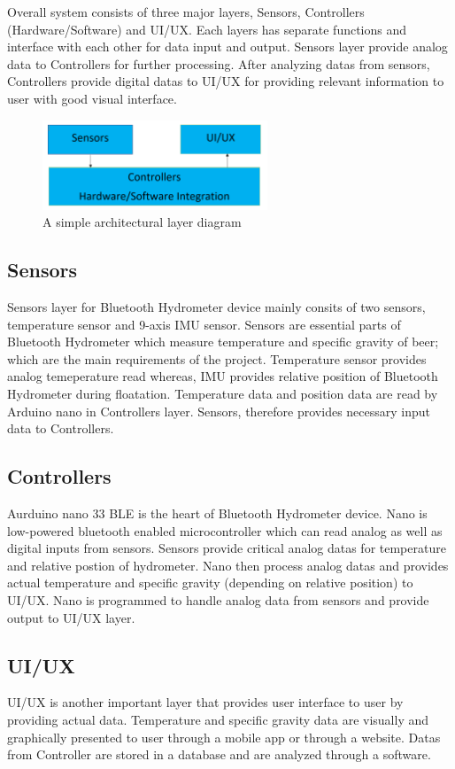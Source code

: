 Overall system consists of three major layers, Sensors, Controllers (Hardware/Software) and UI/UX. Each layers has separate functions and interface with each other for data input and output. Sensors layer provide analog data to Controllers for further processing. After analyzing datas from sensors, Controllers provide digital datas to UI/UX for providing relevant information to user with good visual interface.

\begin{figure}[h!]
	\centering
 	\includegraphics[width=0.60\textwidth]{images/bluetooth_hydrometer_layers}
 \caption{A simple architectural layer diagram}
\end{figure}

\subsection{Sensors}
Sensors layer for Bluetooth Hydrometer device mainly consits of two sensors, temperature sensor and 9-axis IMU sensor.  Sensors are essential parts of Bluetooth Hydrometer which measure temperature and specific gravity of beer; which are the main requirements of the project.  Temperature sensor provides analog temeperature read whereas, IMU provides relative position of Bluetooth Hydrometer during floatation. Temperature data and position data are read by Arduino nano in Controllers layer. Sensors, therefore provides necessary input data to Controllers.

\subsection{Controllers}
Aurduino nano 33 BLE is the heart of Bluetooth Hydrometer device. Nano is low-powered bluetooth enabled microcontroller which can read analog as well as digital inputs from sensors.  Sensors provide critical analog datas for temperature and relative postion of hydrometer.  Nano then process analog datas and provides actual temperature and specific gravity (depending on relative position) to UI/UX. 
Nano is programmed to handle analog data from sensors and provide output to UI/UX layer.


\subsection{UI/UX}
UI/UX is another important layer that provides user interface to user by providing actual data. Temperature and specific gravity data are visually and graphically presented to user through a mobile app or through a website. Datas from Controller are stored in a database and are analyzed through a software.